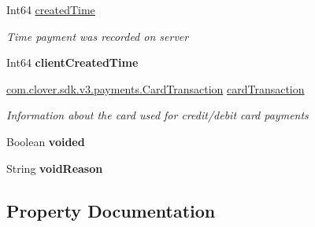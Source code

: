 \begin{DoxyCompactItemize}
\item 
Int64 \hyperlink{classcom_1_1clover_1_1sdk_1_1v3_1_1payments_1_1_credit_a7e363c4d7b48fa5556339e31cb7c3cb4}{created\+Time}
\begin{DoxyCompactList}\small\item\em Time payment was recorded on server \end{DoxyCompactList}\item 
\mbox{\label{classcom_1_1clover_1_1sdk_1_1v3_1_1payments_1_1_credit_a59007eafcb6a85400f3b41f101d4aced}} 
Int64 {\bfseries client\+Created\+Time}
\item 
\hyperlink{classcom_1_1clover_1_1sdk_1_1v3_1_1payments_1_1_card_transaction}{com.\+clover.\+sdk.\+v3.\+payments.\+Card\+Transaction} \hyperlink{classcom_1_1clover_1_1sdk_1_1v3_1_1payments_1_1_credit_acade4c966d115789de6e50f7b1bcdec6}{card\+Transaction}
\begin{DoxyCompactList}\small\item\em Information about the card used for credit/debit card payments \end{DoxyCompactList}\item 
\mbox{\label{classcom_1_1clover_1_1sdk_1_1v3_1_1payments_1_1_credit_a7867234134c2b351bcb2eb81f3acd615}} 
Boolean {\bfseries voided}
\item 
\mbox{\label{classcom_1_1clover_1_1sdk_1_1v3_1_1payments_1_1_credit_a15f2c21b091cb72c279bccd926eaf913}} 
String {\bfseries void\+Reason}
\end{DoxyCompactItemize}


\subsection{Property Documentation}
\mbox{\label{classcom_1_1clover_1_1sdk_1_1v3_1_1payments_1_1_credit_ab99189a5b7662b47323aca6862b99c0c}} 
